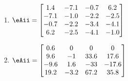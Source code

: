 \begin{exercise}
\begin{enumerate}
\item \(\eAii=\begin{bmatrix} 1.4 & -7.1 & -0.7 & 6.2
\\ -7.1 & -1.0 & -2.2 & -2.5
\\ -0.7 & -2.2 & -3.4 & -4.1
\\ 6.2 & -2.5 & -4.1 & -1.0 \end{bmatrix}\)
\setbox\ajrqrbox\hbox{\qrcode{%
[1.4 -7.1 -0.7 6.2
-7.1 -1.0 -2.2 -2.5
-0.7 -2.2 -3.4 -4.1
6.2 -2.5 -4.1 -1.0]
}}\marginpar{\usebox{\ajrqrbox}}%

\item \(\eAii=\begin{bmatrix} 0.6 & 0 & 0 & 0
\\9.6 & -1 & 33.6 & 17.6
\\-9.6 & 1.6 & -33 & -17.6
\\19.2 & -3.2 & 67.2 & 35.8 \end{bmatrix}\)
\setbox\ajrqrbox\hbox{\qrcode{%
[0.6 0 0 0
9.6 -1 33.6 17.6
-9.6 1.6 -33 -17.6
19.2 -3.2 67.2 35.8]
}}\marginpar{\usebox{\ajrqrbox}}%

\end{enumerate}
\end{exercise}






